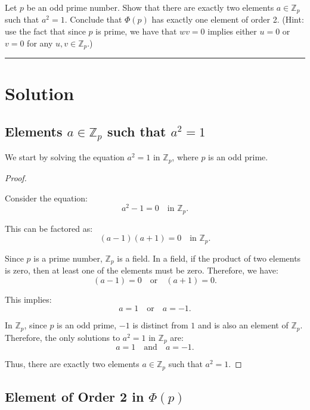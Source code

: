 \documentclass[12pt]{amsart}
\theoremstyle{definition}
\numberwithin{equation}{section}
\newcommand{\Z}{\mathbb{Z}}
\begin{document}
\begin{exercise}{7} Let $p$ be an odd prime number. Show that there are exactly two elements \(a \in \Z_p\) such that \(a^2=1\). Conclude that \(\Phi(p)\) has exactly one element of order 2. (Hint: use the fact that since $p$ is prime, we have that \(wv=0\) implies either \(u=0\) or \(v=0\) for any \(u,v \in \Z_p\).)
    
    \noindent\rule{\linewidth}{1pt}
    
    \section*{Solution}

    \subsection*{Elements \(a \in \Z_p\) such that \(a^2 = 1\)}
    
    We start by solving the equation \(a^2 = 1\) in \(\Z_p\), where \(p\) is an odd prime.
    
    \begin{proof} \( \)
    
    Consider the equation:
    \[
    a^2 - 1 = 0 \quad \text{in } \Z_p.
    \]
    
    This can be factored as:
    \[
    (a - 1)(a + 1) = 0 \quad \text{in } \Z_p.
    \]
    
    Since \(p\) is a prime number, \(\Z_p\) is a field. In a field, if the product of two elements is zero, then at least one of the elements must be zero. Therefore, we have:
    \[
    (a - 1) = 0 \quad \text{or} \quad (a + 1) = 0.
    \]
    
    This implies:
    \[
    a = 1 \quad \text{or} \quad a = -1.
    \]
    
    In \(\Z_p\), since \(p\) is an odd prime, \(-1\) is distinct from \(1\) and is also an element of \(\Z_p\). Therefore, the only solutions to \(a^2 = 1\) in \(\Z_p\) are:
    \[
    a = 1 \quad \text{and} \quad a = -1.
    \]
    
    Thus, there are exactly two elements \(a \in \Z_p\) such that \(a^2 = 1\).
    
    \end{proof}
    
    \subsection*{Element of Order 2 in \(\Phi(p)\)}
    

\end{exercise}
\end{document}
